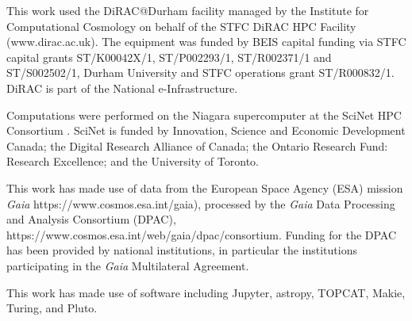 This work used the DiRAC@Durham facility managed by the Institute for
Computational Cosmology on behalf of the STFC DiRAC HPC Facility
(www.dirac.ac.uk). The equipment was funded by BEIS capital funding via
STFC capital grants ST/K00042X/1, ST/P002293/1, ST/R002371/1 and
ST/S002502/1, Durham University and STFC operations grant ST/R000832/1.
DiRAC is part of the National e-Infrastructure.

Computations were performed on the Niagara supercomputer
\citep{ponce+2019} at the SciNet HPC Consortium \citep{loken+2010}.
SciNet is funded by Innovation, Science and Economic Development Canada;
the Digital Research Alliance of Canada; the Ontario Research Fund:
Research Excellence; and the University of Toronto.

This work has made use of data from the European Space Agency (ESA)
mission \emph{Gaia} https://www.cosmos.esa.int/gaia), processed by the
\emph{Gaia} Data Processing and Analysis Consortium (DPAC),
https://www.cosmos.esa.int/web/gaia/dpac/consortium. Funding for the
DPAC has been provided by national institutions, in particular the
institutions participating in the \emph{Gaia} Multilateral Agreement.

This work has made use of software including Jupyter, astropy, TOPCAT,
Makie, Turing, and Pluto.
